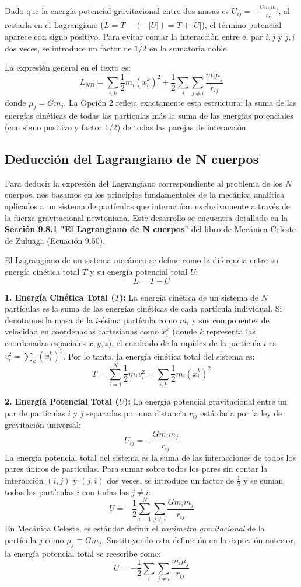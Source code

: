 \documentclass[a4paper]{article}
\begin{document}
Dado que la energía potencial gravitacional entre dos masas es $U_{ij} = -\frac{G m_i m_j}{r_{ij}}$, al restarla en el Lagrangiano ($L = T - (-|U|) = T + |U|$), el término potencial aparece con signo positivo. Para evitar contar la interacción entre el par $i,j$ y $j,i$ dos veces, se introduce un factor de $1/2$ en la sumatoria doble.

La expresión general en el texto es:
$$L_{NB} = \sum_{i,k} \frac{1}{2} m_i (\dot{x}^k_i)^2 + \frac{1}{2} \sum_i \sum_{j \neq i} \frac{m_i \mu_j}{r_{ij}}$$
donde $\mu_j = G m_j$. La Opción 2 refleja exactamente esta estructura: la suma de las energías cinéticas de todas las partículas más la suma de las energías potenciales (con signo positivo y factor 1/2) de todas las parejas de interacción.

\subsection{Deducción del Lagrangiano de N cuerpos}

Para deducir la expresión del Lagrangiano correspondiente al problema de los $N$ cuerpos, nos basamos en los principios fundamentales de la mecánica analítica aplicados a un sistema de partículas que interactúan exclusivamente a través de la fuerza gravitacional newtoniana. Este desarrollo se encuentra detallado en la \textbf{Sección 9.8.1 "El Lagrangiano de N cuerpos"} del libro de Mecánica Celeste de Zuluaga (Ecuación 9.50).

El Lagrangiano de un sistema mecánico se define como la diferencia entre su energía cinética total $T$ y su energía potencial total $U$:
$$L = T - U$$

\textbf{1. Energía Cinética Total ($T$):}
La energía cinética de un sistema de $N$ partículas es la suma de las energías cinéticas de cada partícula individual. Si denotamos la masa de la $i$-ésima partícula como $m_i$ y sus componentes de velocidad en coordenadas cartesianas como $\dot{x}^k_i$ (donde $k$ representa las coordenadas espaciales $x, y, z$), el cuadrado de la rapidez de la partícula $i$ es $v_i^2 = \sum_k (\dot{x}^k_i)^2$. Por lo tanto, la energía cinética total del sistema es:
$$T = \sum_{i=1}^N \frac{1}{2} m_i v_i^2 = \sum_{i,k} \frac{1}{2} m_i (\dot{x}^k_i)^2$$

\textbf{2. Energía Potencial Total ($U$):}
La energía potencial gravitacional entre un par de partículas $i$ y $j$ separadas por una distancia $r_{ij}$ está dada por la ley de gravitación universal:
$$U_{ij} = - \frac{G m_i m_j}{r_{ij}}$$
La energía potencial total del sistema es la suma de las interacciones de todos los pares únicos de partículas. Para sumar sobre todos los pares sin contar la interacción $(i, j)$ y $(j, i)$ dos veces, se introduce un factor de $\frac{1}{2}$ y se suman todas las partículas $i$ con todas las $j \neq i$:
$$U = - \frac{1}{2} \sum_{i=1}^N \sum_{j \neq i} \frac{G m_i m_j}{r_{ij}}$$
En Mecánica Celeste, es estándar definir el \textit{parámetro gravitacional} de la partícula $j$ como $\mu_j \equiv G m_j$. Sustituyendo esta definición en la expresión anterior, la energía potencial total se reescribe como:
$$U = - \frac{1}{2} \sum_i \sum_{j \neq i} \frac{m_i \mu_j}{r_{ij}}$$
\end{document}
